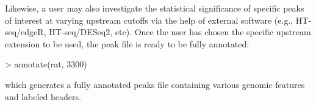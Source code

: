 \documentclass[12pt]{article}
\begin{document}
Likewise, a user may also investigate the statistical significance of specific peaks of interest at varying upstream cutoffs via the help of external software (e.g., HT-seq/edgeR, HT-seq/DESeq2, etc).  Once the user has chosen the specific upstream extension to be used, the peak file is ready to be fully annotated:

\begin{Schunk}
\begin{Sinput}
> annotate(rat, 3300)
\end{Sinput}
\end{Schunk}

which generates a fully annotated peaks file containing various genomic features and labeled headers.  
\end{document}
